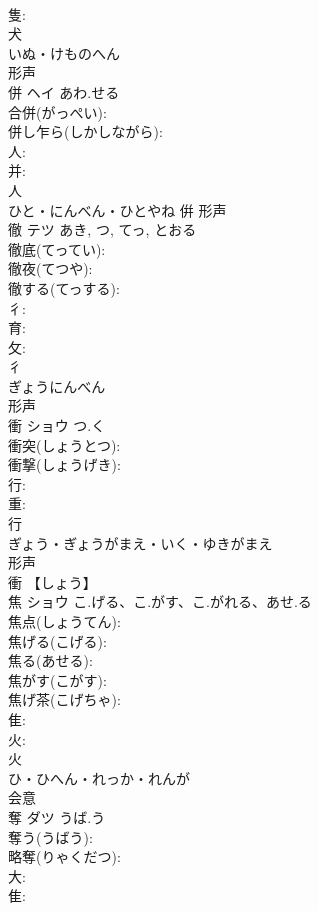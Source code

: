 \documentclass[8pt]{extreport}
\begin{document}
\begin{CJK}{UTF8}{min}
\\	隻: 
\\	犬	
\\	いぬ・けものへん	
\\	形声 
\\	併	ヘイ	あわ.せる		
\\	合併(がっぺい): 
\\	併し乍ら(しかしながら): 
\\	人: 
\\	并: 
\\	人	
\\	ひと・にんべん・ひとやね	倂	形声 
\\	徹	テツ		あき, つ, てっ, とおる	
\\	徹底(てってい): 
\\	徹夜(てつや): 
\\	徹する(てっする): 
\\	彳: 
\\	育: 
\\	攵: 
\\	彳	
\\	ぎょうにんべん	
\\	形声 
\\	衝	ショウ	つ.く		
\\	衝突(しょうとつ): 
\\	衝撃(しょうげき): 
\\	行: 
\\	重: 
\\	行	
\\	ぎょう・ぎょうがまえ・いく・ゆきがまえ	
\\	形声 
\\	衝 【しょう】 
\\	焦	ショウ	こ.げる、こ.がす、こ.がれる、あせ.る		
\\	焦点(しょうてん): 
\\	焦げる(こげる): 
\\	焦る(あせる): 
\\	焦がす(こがす): 
\\	焦げ茶(こげちゃ): 
\\	隹: 
\\	火: 
\\	火	
\\	ひ・ひへん・れっか・れんが	
\\	会意 
\\	奪	ダツ	うば.う		
\\	奪う(うばう): 
\\	略奪(りゃくだつ): 
\\	大: 
\\	隹: 

\end{CJK}
\end{document}
